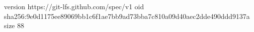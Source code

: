 version https://git-lfs.github.com/spec/v1
oid sha256:9e0d1175ee89069bb1c6f1ae7bb9ad73bba7c810a09d40aec2dde490ddd9137a
size 88
